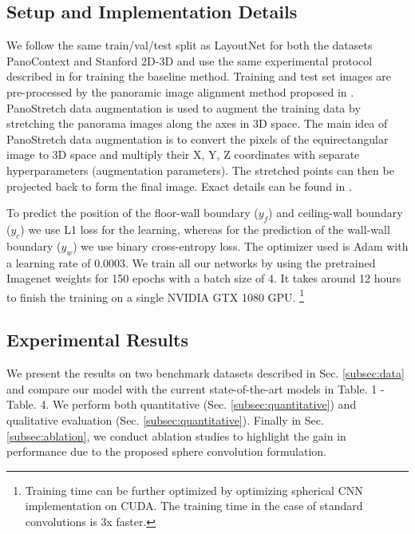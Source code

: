 \documentclass[final]{cvpr}
\begin{document}
\subsection{Setup and Implementation Details}\label{subsec:training_Details}

We follow the same train/val/test split as LayoutNet \cite{zou2018layoutnet} for both the datasets PanoContext \cite{zhang2014panocontext} and Stanford 2D-3D \cite{armeni2017joint} and use the same experimental protocol described in \cite{sun2019horizonnet} for training the baseline method. Training and test set images are pre-processed by the panoramic image alignment method proposed in \cite{zou2018layoutnet}. PanoStretch data augmentation \cite{sun2019horizonnet} is used to augment the training data by stretching the panorama images along the axes in 3D space. The main idea of PanoStretch data augmentation \cite{sun2019horizonnet} is to convert the pixels of the equirectangular image to 3D space and multiply their X, Y, Z coordinates with separate hyperparameters (augmentation parameters). The stretched points can then be projected back to form the final image. Exact details can be found in  \cite{sun2019horizonnet}.


To predict the position of the floor-wall boundary ($y_f$) and ceiling-wall boundary ($y_c$) we use L1 loss for the learning, whereas for the prediction of the wall-wall boundary ($y_w$) we use binary cross-entropy loss. The optimizer used is Adam with a learning rate of 0.0003. We train all our networks by using the pretrained Imagenet weights for 150 epochs with a batch size of 4. It takes around 12 hours to finish the training on a single NVIDIA GTX 1080 GPU. \footnote{Training time can be further optimized by optimizing spherical CNN implementation on CUDA. The training time in the case of standard convolutions is 3x faster.}





\subsection{Experimental Results}\label{subsec:results}
We present the results on two benchmark datasets described in Sec. \ref{subsec:data} and compare our model with the current state-of-the-art models in Table. 1 - Table. 4.
We perform both quantitative (Sec. \ref{subsec:quantitative}) and qualitative evaluation (Sec. \ref{subsec:quantitative}). Finally in Sec.  \ref{subsec:ablation}, we conduct ablation studies to highlight the gain in performance due to the proposed sphere convolution formulation.
\end{document}

